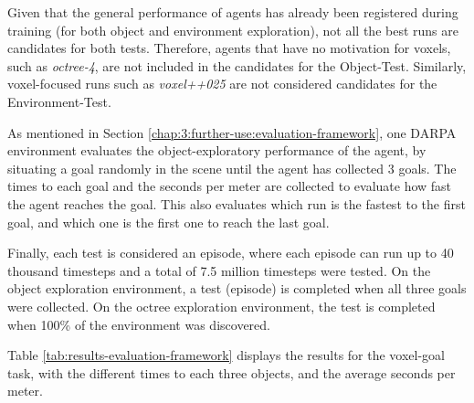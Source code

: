 Given that the general performance of agents has already been registered during training (for both object and environment exploration), not all the best runs are candidates for both tests. 
Therefore, agents that have no motivation for voxels, such as \textit{octree-4}, are not included in the candidates for the {Object-Test}. Similarly, voxel-focused runs such as \textit{voxel++025} are not considered candidates for the Environment-Test.

As mentioned in Section \ref{chap:3:further-use:evaluation-framework}, one DARPA environment evaluates the object-exploratory performance of the agent, by situating a goal randomly in the scene until the agent has collected 3 goals. The times to each goal and the seconds per meter are collected to evaluate how fast the agent reaches the goal. 
This also evaluates which run is the fastest to the first goal, and which one is the first one to reach the last goal. 

\newpage 

Finally, each test is considered an episode, where each episode can run up to 40 thousand timesteps and a total of 7.5 million timesteps were tested. On the object exploration environment, a test (episode) is completed when all three goals were collected. On the octree exploration environment, the test is completed when 100\% of the environment was discovered. 

Table \ref{tab:results-evaluation-framework} displays the results for the voxel-goal task, with the different times to each three objects, and the average seconds per meter. 


